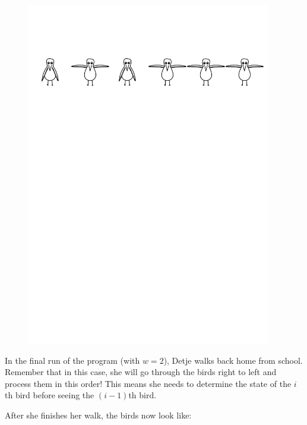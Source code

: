 \begin{figure}[h]
\centering
\includegraphics[width=0.95\textwidth]{s1r1}
\end{figure}

In the final run of the program (with $w = 2$),
Detje walks back home from school.
Remember that in this case, she will go through the birds right to left and process them in this order!
This means she needs to determine the state of the $i$th bird before seeing the $(i-1)$th bird.

After she finishes her walk, the birds now look like:

